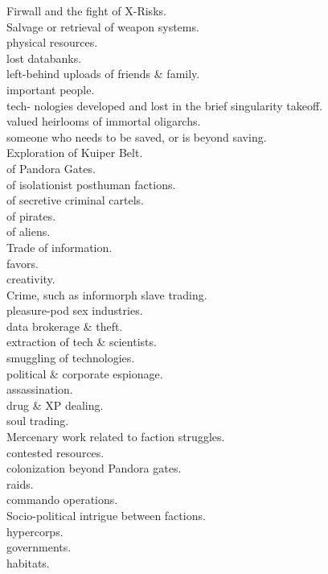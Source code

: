 \documentclass[a4]{article}
\begin{document}
\starttableone
Firwall and the fight of X-Risks.\\
Salvage or retrieval of weapon systems.\\
\textellipsis physical resources.\\
\textellipsis lost databanks.\\
\textellipsis left-behind uploads of friends \& family.\\
\textellipsis important people.\\
\textellipsis tech- nologies developed and lost in the brief singularity takeoff.\\
\textellipsis valued heirlooms of immortal oligarchs.\\
\textellipsis someone who needs to be saved, or is beyond saving.\\
Exploration of Kuiper Belt.\\
\textellipsis of Pandora Gates.\\
\textellipsis of isolationist posthuman factions.\\
\textellipsis of secretive criminal cartels.\\
\textellipsis of pirates.\\
\textellipsis of aliens.\\
Trade of information.\\
\textellipsis favors.\\
\textellipsis creativity.\\
Crime, such as informorph slave trading.\\
\textellipsis pleasure-pod sex industries.\\
\textellipsis data brokerage \& theft.\\
\textellipsis extraction of tech \& scientists.\\
\textellipsis smuggling of technologies.\\
\textellipsis political \& corporate espionage.\\
\textellipsis assassination.\\
\textellipsis drug \& XP dealing.\\
\textellipsis soul trading.\\
Mercenary work related to faction struggles.\\
\textellipsis contested resources.\\
\textellipsis colonization beyond Pandora gates.\\
\textellipsis raids.\\
\textellipsis commando operations.\\
Socio-political intrigue between factions.\\
\textellipsis hypercorps.\\
\textellipsis governments.\\
\textellipsis habitats.\\
\stoptableone
\end{document}
